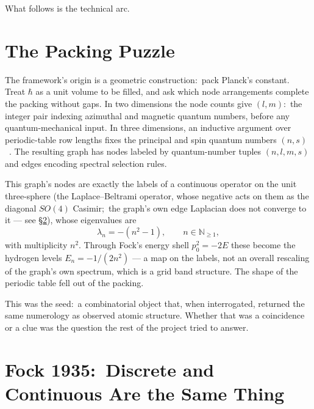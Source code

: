 \documentclass[11pt,a4paper]{article}
\newcommand{\N}{\mathbb{N}}
\newcommand{\gvc}[2]{#2}
\begin{document}
What follows is the technical arc.

\section{The Packing Puzzle}
\label{sec:packing}

The framework's origin is a geometric construction:\ pack
Planck's constant.  Treat $\hbar$ as a unit volume to be filled, and
ask which node arrangements complete the packing without gaps.  In two
dimensions the node counts give $(l, m)$:\ the integer pair indexing
azimuthal and magnetic quantum numbers, before any quantum-mechanical
input.  In three dimensions, an inductive argument over periodic-table
row lengths fixes the principal and spin quantum numbers
$(n, s)$~\cite{loutey_paper0}.  The resulting graph has nodes labeled
by quantum-number tuples $(n, l, m, s)$ and edges encoding spectral
selection rules.

This graph's nodes are exactly the labels of a continuous operator on
the unit three-sphere (the Laplace--Beltrami operator, whose negative
acts on them as the diagonal $SO(4)$ Casimir;\ \gvc{graph-s3-wall}{the graph's own edge
Laplacian does not converge to it --- see \S\ref{sec:fock}}), whose
eigenvalues are
\begin{equation}
\label{eq:graph_eigs}
\lambda_n = -(n^2 - 1), \qquad n \in \N_{\ge 1},
\end{equation}
with multiplicity $n^2$.  Through Fock's energy shell $p_0^2 = -2E$
these become the hydrogen levels $E_n = -1/(2n^2)$ --- a map on the
labels, not an overall rescaling of the graph's own spectrum, which is a
grid band structure.  The shape of the periodic table fell out of
the packing.

This was the seed:\ a combinatorial object that, when interrogated,
returned the same numerology as observed atomic structure.  Whether
that was a coincidence or a clue was the question the rest of the
project tried to answer.

\section{Fock 1935:\ Discrete and Continuous Are the Same Thing}
\label{sec:fock}
\end{document}
